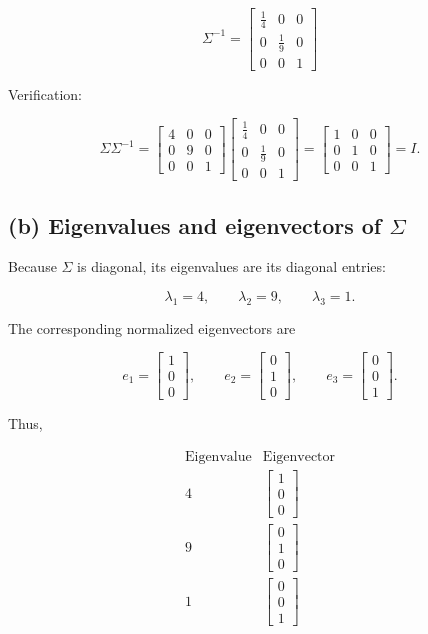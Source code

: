 \documentclass[12pt]{article}
\begin{document}
\[
\boxed{
\Sigma^{-1}
=
\begin{bmatrix}
\frac14&0&0\\
0&\frac19&0\\
0&0&1
\end{bmatrix}}
\]

Verification:

\[
\Sigma\Sigma^{-1}
=
\begin{bmatrix}
4&0&0\\
0&9&0\\
0&0&1
\end{bmatrix}
\begin{bmatrix}
\frac14&0&0\\
0&\frac19&0\\
0&0&1
\end{bmatrix}
=
\begin{bmatrix}
1&0&0\\
0&1&0\\
0&0&1
\end{bmatrix}
=I.
\]

\subsection*{(b) Eigenvalues and eigenvectors of $\Sigma$}

Because $\Sigma$ is diagonal, its eigenvalues are its diagonal
entries:

\[
\boxed{
\lambda_1=4,\qquad
\lambda_2=9,\qquad
\lambda_3=1.
}
\]

The corresponding normalized eigenvectors are

\[
\boxed{
e_1=
\begin{bmatrix}
1\\0\\0
\end{bmatrix},
\qquad
e_2=
\begin{bmatrix}
0\\1\\0
\end{bmatrix},
\qquad
e_3=
\begin{bmatrix}
0\\0\\1
\end{bmatrix}.
}
\]

Thus,

\[
\boxed{
\begin{array}{c|c}
\text{Eigenvalue} & \text{Eigenvector}\\
\hline
4 & \begin{bmatrix}1\\0\\0\end{bmatrix}\\[6pt]
9 & \begin{bmatrix}0\\1\\0\end{bmatrix}\\[6pt]
1 & \begin{bmatrix}0\\0\\1\end{bmatrix}
\end{array}}
\]
\end{document}
